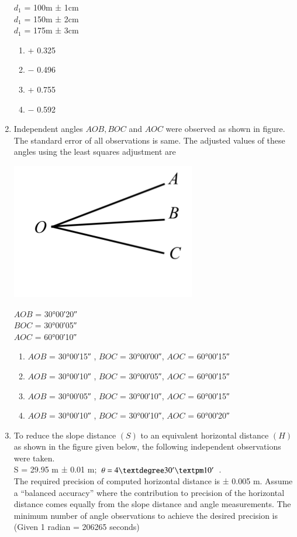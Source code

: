 \documentclass[12pt]{article}
\begin{document}
\begin{enumerate}
  $d_1$ = 100m ± 1cm\\ 
  $d_1$ = 150m ± 2cm \\
  $d_1$ = 175m ± 3cm 

  \begin{enumerate}
    \item + 0.325 
   \item $-$ 0.496 
   \item + 0.755 
   \item $-$ 0.592
  \end{enumerate}

\item Independent angles $AOB, BOC$ and $AOC$ were observed as shown in figure. The
standard error of all observations is same. The adjusted values of these angles
using the least squares adjustment are 

\includegraphics[scale = 0.9]{Figs/LatexImage5.png} 

  $AOB$ = \ang{30;00;20} \\
  $BOC$ = \ang{30;00;05}\\
  $AOC$ = \ang{60;00;10} 

  \begin{enumerate}
    \item $AOB$ = \ang{30;00;15} , $BOC$ = \ang{30;00;00}, $AOC$ = \ang{60;00;15} 
   \item $AOB$ = \ang{30;00;10} , $BOC$ = \ang{30;00;05}, $AOC$ = \ang{60;00;15} 
   \item $AOB$ = \ang{30;00;05} , $BOC$ = \ang{30;00;10}, $AOC$ = \ang{60;00;15} 
   \item $AOB$ = \ang{30;00;10} , $BOC$ = \ang{30;00;10}, $AOC$ = \ang{60;00;20}
  \end{enumerate}

\item To reduce the slope distance $(S)$ to an equivalent horizontal distance $(H)$ as shown in the figure given below, the following independent observations were taken.\\
  S = 29.95 m ± 0.01 m; $\theta = 4\textdegree 30' ± 10'$ . \\
  The required precision of computed horizontal distance is ± 0.005 m. Assume a “balanced accuracy” where the contribution to precision of the horizontal distance comes equally from the slope distance and angle measurements. The minimum number of angle observations to achieve the desired precision is\\ 
   (Given 1 radian = 206265 seconds) \\


\end{enumerate}
\end{document}
